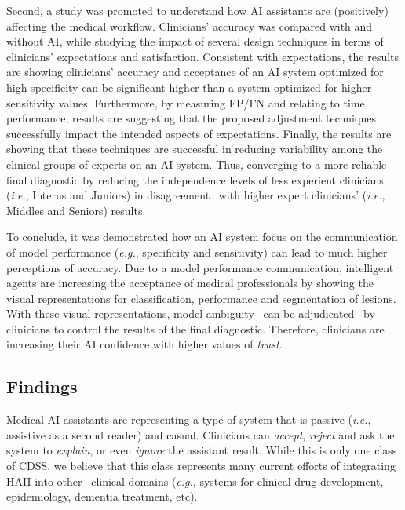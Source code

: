 Second, a study was promoted to understand how AI assistants are (positively) affecting the medical workflow.
Clinicians' accuracy was compared with and without AI, while studying the impact of several design techniques in terms of clinicians' expectations and satisfaction.
Consistent with expectations, the results are showing clinicians' accuracy and acceptance of an AI system optimized for high specificity can be significant higher than a system optimized for higher sensitivity values.
Furthermore, by measuring FP/FN and relating to time performance, results are suggesting that the proposed adjustment techniques successfully impact the intended aspects of expectations.
Finally, the results are showing that these techniques are successful in reducing variability among the clinical groups of experts on an AI system.
Thus, converging to a more reliable final diagnostic by reducing the independence levels of less experient clinicians ({\it i.e.}, Interns and Juniors) in disagreement~\cite{schaekermann2018expert} with higher expert clinicians' ({\it i.e.}, Middles and Seniors) results.

To conclude, it was demonstrated how an AI system focus on the communication of model performance ({\it e.g.}, specificity and sensitivity) can lead to much higher perceptions of accuracy.
Due to a model performance communication, intelligent agents are increasing the acceptance of medical professionals by showing the visual representations for classification, performance and segmentation of lesions.
With these visual representations, model ambiguity~\cite{SchaekermannMike2020} can be adjudicated~\cite{10.1145/3359178, 10.1167/tvst.8.6.40} by clinicians to control the results of the final diagnostic.
Therefore, clinicians are increasing their AI confidence with higher values of {\it trust}.

\subsection{Findings}

Medical AI-assistants are representing a type of system that is passive ({\it i.e.}, assistive as a second reader) and casual.
Clinicians can {\it accept}, {\it reject} and ask the system to {\it explain}, or even {\it ignore} the assistant result.
While this is only one class of CDSS, we believe that this class represents many current efforts of integrating HAII into other~\cite{Savage2019, shah2019artificial, topol2019high} clinical domains ({\it e.g.}, systems for clinical drug development, epidemiology, dementia treatment, etc).

